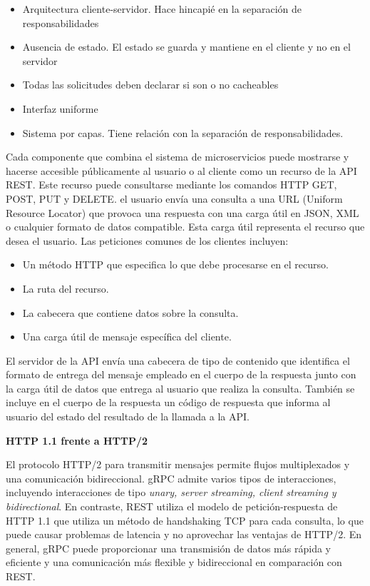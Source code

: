 \begin{itemize}
    \item Arquitectura cliente-servidor.
    Hace hincapié en la separación de responsabilidades
    \item Ausencia de estado.
    El estado se guarda y mantiene en el cliente y no en el servidor
    \item Todas las solicitudes deben declarar si son o no cacheables
    \item Interfaz uniforme
    \item Sistema por capas.
    Tiene relación con la separación de responsabilidades.
\end{itemize}

Cada componente que combina el sistema de microservicios puede mostrarse y hacerse accesible públicamente al usuario o al cliente como un recurso de la API REST. Este recurso puede consultarse mediante los comandos HTTP GET, POST, PUT y DELETE. el usuario envía una consulta a una URL (Uniform Resource Locator) que provoca una respuesta con una carga útil en JSON, XML o cualquier formato de datos compatible.
Esta carga útil representa el recurso que desea el usuario.
Las peticiones comunes de los clientes incluyen:

\begin{itemize}
    \item Un método HTTP que especifica lo que debe procesarse en el recurso.
    \item La ruta del recurso.
    \item La cabecera que contiene datos sobre la consulta.
    \item Una carga útil de mensaje específica del cliente.
\end{itemize}

El servidor de la API envía una cabecera de tipo de contenido que identifica el formato de entrega del mensaje empleado en el cuerpo de la respuesta junto con la carga útil de datos que entrega al usuario que realiza la consulta.
También se incluye en el cuerpo de la respuesta un código de respuesta que informa al usuario del estado del resultado de la llamada a la API\@.

\textbf{HTTP 1.1 frente a HTTP/2}

El protocolo HTTP/2 para transmitir mensajes permite flujos multiplexados y una comunicación bidireccional.
gRPC admite varios tipos de interacciones, incluyendo interacciones de tipo \textit{unary, server streaming, client streaming y bidirectional}.
En contraste, REST utiliza el modelo de petición-respuesta de HTTP 1.1 que utiliza un método de handshaking TCP para cada consulta, lo que puede causar problemas de latencia y no aprovechar las ventajas de HTTP/2.
En general, gRPC puede proporcionar una transmisión de datos más rápida y eficiente y una comunicación más flexible y bidireccional en comparación con REST\@.

